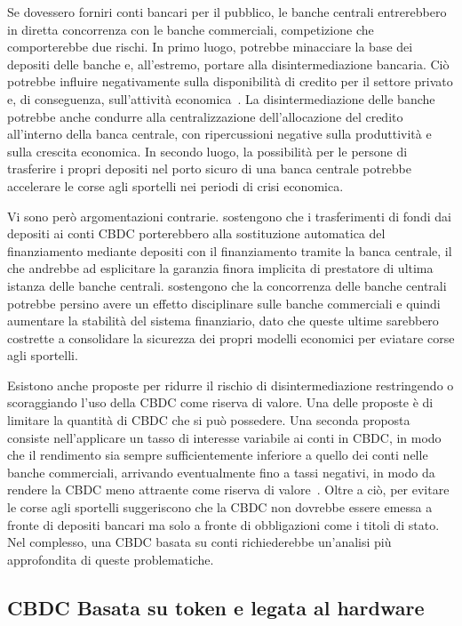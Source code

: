 \documentclass{article}
\begin{document}
Se dovessero forniri conti bancari per il pubblico, le banche centrali 
entrerebbero in diretta concorrenza con le banche commerciali, competizione 
che comporterebbe due rischi. In primo luogo, potrebbe minacciare la base 
dei depositi delle banche e, all'estremo, portare alla disintermediazione 
bancaria. Ciò potrebbe influire negativamente sulla disponibilità di 
credito per il settore privato e, di conseguenza, sull'attività 
economica~\cite{Agur}. La disintermediazione delle banche potrebbe anche 
condurre alla centralizzazione dell'allocazione del credito all'interno 
della banca centrale, con ripercussioni negative sulla produttività e 
sulla crescita economica. In secondo luogo, la possibilità per le persone 
di trasferire i propri depositi nel porto sicuro di una banca centrale 
potrebbe accelerare le corse agli sportelli nei periodi di crisi economica.

Vi sono però argomentazioni contrarie. \cite{Brunnermeier} 
sostengono che i trasferimenti di fondi dai depositi ai conti 
CBDC porterebbero alla sostituzione automatica del finanziamento 
mediante depositi con il finanziamento tramite la banca centrale, il 
che andrebbe ad esplicitare la garanzia finora implicita di prestatore 
di ultima istanza delle banche centrali. \cite{Berentsen} 
sostengono che la concorrenza delle banche centrali potrebbe persino 
avere un effetto disciplinare sulle banche commerciali e quindi 
aumentare la stabilità del sistema finanziario, dato che queste ultime 
sarebbero costrette a consolidare la sicurezza dei propri modelli 
economici per eviatare corse agli sportelli.

Esistono anche proposte per ridurre il rischio di disintermediazione 
restringendo o scoraggiando l'uso della CBDC come riserva di valore. Una 
delle proposte è di limitare la quantità di CBDC che si può possedere. 
Una seconda proposta consiste nell'applicare un tasso di interesse 
variabile ai conti in CBDC, in modo che il rendimento sia sempre 
sufficientemente inferiore a quello dei conti nelle banche commerciali, 
arrivando eventualmente fino a tassi negativi, in modo da rendere la CBDC 
meno attraente come riserva di valore~\cite{Kumhof,Bindseil}. Oltre a ciò, 
per evitare le corse agli sportelli \cite{Kumhof} suggeriscono che la 
CBDC non dovrebbe essere emessa a fronte di depositi bancari ma solo a 
fronte di obbligazioni come i titoli di stato. Nel complesso, una CBDC 
basata su conti richiederebbe un'analisi più approfondita di queste 
problematiche.

\subsection{CBDC Basata su token e legata al hardware}
\label{cbdc-basata-su-token-e-legata-al-hardware}
\end{document}
